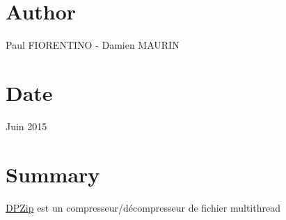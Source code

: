 \hypertarget{index_author_sec}{}\section{Author}\label{index_author_sec}
Paul F\+I\+O\+R\+E\+N\+T\+I\+N\+O -\/ Damien M\+A\+U\+R\+I\+N\hypertarget{index_date_sec}{}\section{Date}\label{index_date_sec}
Juin 2015\hypertarget{index_summary_sec}{}\section{Summary}\label{index_summary_sec}
\hyperlink{class_d_p_zip}{D\+P\+Zip} est un compresseur/décompresseur de fichier multithread 